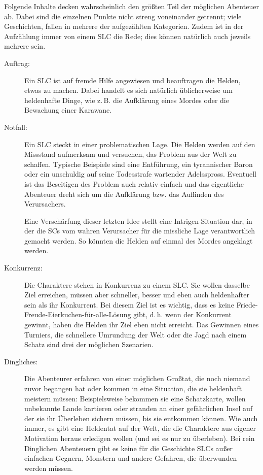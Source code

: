 Folgende Inhalte decken wahrscheinlich den größten Teil der möglichen Abenteuer ab. Dabei sind die einzelnen Punkte nicht streng voneinander getrennt; viele Geschichten, fallen in mehrere der aufgezählten Kategorien. Zudem ist in der Aufzählung immer von einem SLC die Rede; dies können natürlich auch jeweils mehrere sein.
\begin{description}
\item[Auftrag:] Ein SLC ist auf fremde Hilfe angewiesen und beauftragen die Helden, etwas zu machen. Dabei handelt es sich natürlich üblicherweise um heldenhafte Dinge, wie z.\,B. die Aufklärung eines Mordes oder die Bewachung einer Karawane.

\item[Notfall:] Ein SLC steckt in einer problematischen Lage. Die Helden werden auf den Missstand aufmerksam und versuchen, das Problem aus der Welt zu schaffen. Typische Beispiele sind eine Entführung, ein tyrannischer Baron oder ein unschuldig auf seine Todesstrafe wartender Adelsspross. Eventuell ist das Beseitigen des Problem auch relativ einfach und das eigentliche Abenteuer dreht sich um die Aufklärung bzw. das Auffinden des Verursachers.

Eine Verschärfung dieser letzten Idee stellt eine Intrigen-Situation dar, in der die SCs vom wahren Verursacher für die missliche Lage verantwortlich gemacht werden. So könnten die Helden auf einmal des Mordes angeklagt werden.

\item[Konkurrenz:] Die Charaktere stehen in Konkurrenz zu einem SLC. Sie wollen dasselbe Ziel erreichen, müssen aber schneller, besser und eben auch heldenhafter sein als ihr Konkurrent. Bei diesem Ziel ist es wichtig, dass es keine Friede-Freude-Eierkuchen-für-alle-Lösung gibt, d.\,h. wenn der Konkurrent gewinnt, haben die Helden ihr Ziel eben nicht erreicht. Das Gewinnen eines Turniers, die schnellere Umrundung der Welt oder die Jagd nach einem Schatz sind drei der möglichen Szenarien.

\item[Dingliches:] Die Abenteurer erfahren von einer möglichen Großtat, die noch niemand zuvor begangen hat oder kommen in eine Situation, die sie heldenhaft meistern müssen: Beispielsweise bekommen sie eine Schatzkarte, wollen unbekannte Lande kartieren oder stranden an einer gefährlichen Insel auf der sie ihr Überleben sichern müssen, bis sie entkommen können. Wie auch immer, es gibt eine Heldentat auf der Welt, die die Charaktere aus eigener Motivation heraus erledigen wollen (und sei es nur zu überleben). Bei rein Dinglichen Abenteuern gibt es keine für die Geschichte SLCs außer einfachen Gegnern, Monstern und andere Gefahren, die überwunden werden müssen.


\end{description}
